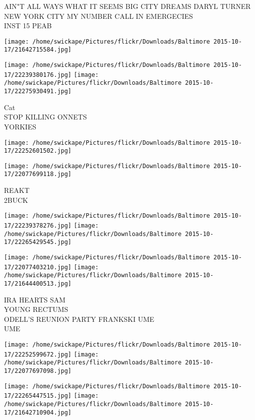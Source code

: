\documentclass[10pt,letterpaper]{article}
\begin{document}
AIN"T ALL WAYS WHAT IT SEEMS BIG CITY DREAMS DARYL TURNER NEW YORK CITY MY NUMBER CALL IN EMERGECIES\\
INST 15 PEAB\\
\pagebreak

\texttt{[image: /home/swickape/Pictures/flickr/Downloads/Baltimore 2015-10-17/21642715584.jpg]}

\vspace{0.25in}
\texttt{[image: /home/swickape/Pictures/flickr/Downloads/Baltimore 2015-10-17/22239380176.jpg]}
\texttt{[image: /home/swickape/Pictures/flickr/Downloads/Baltimore 2015-10-17/22275930491.jpg]}

Cat\\
STOP KILLING ONNETS\\
YORKIES\\
\pagebreak

\texttt{[image: /home/swickape/Pictures/flickr/Downloads/Baltimore 2015-10-17/22252601502.jpg]}

\vspace{0.25in}
\texttt{[image: /home/swickape/Pictures/flickr/Downloads/Baltimore 2015-10-17/22077699118.jpg]}

REAKT\\
2BUCK\\
\pagebreak

\texttt{[image: /home/swickape/Pictures/flickr/Downloads/Baltimore 2015-10-17/22239378276.jpg]}
\texttt{[image: /home/swickape/Pictures/flickr/Downloads/Baltimore 2015-10-17/22265429545.jpg]}

\texttt{[image: /home/swickape/Pictures/flickr/Downloads/Baltimore 2015-10-17/22077403210.jpg]}
\texttt{[image: /home/swickape/Pictures/flickr/Downloads/Baltimore 2015-10-17/21644400513.jpg]}

IRA HEARTS SAM\\
YOUNG RECTUMS\\
ODELL'S REUNION PARTY FRANKSKI UME\\
UME\\
\pagebreak

\texttt{[image: /home/swickape/Pictures/flickr/Downloads/Baltimore 2015-10-17/22252599672.jpg]}
\texttt{[image: /home/swickape/Pictures/flickr/Downloads/Baltimore 2015-10-17/22077697098.jpg]}

\texttt{[image: /home/swickape/Pictures/flickr/Downloads/Baltimore 2015-10-17/22265447515.jpg]}
\texttt{[image: /home/swickape/Pictures/flickr/Downloads/Baltimore 2015-10-17/21642710904.jpg]}
\end{document}
